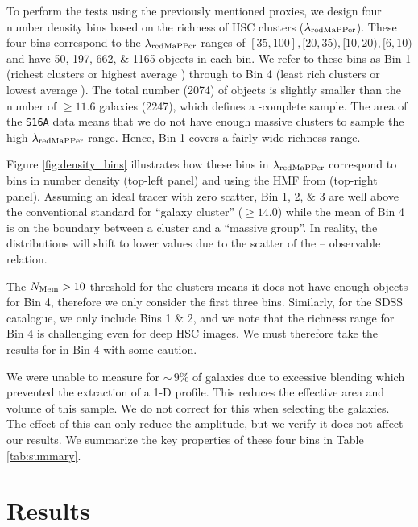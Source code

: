 \documentclass[fleqn,usenatbib,useAMS]{mnras}
\begin{document}
\begin{CJK*}{UTF8}{gbsn}
    To perform the \topn{} tests using the previously mentioned proxies, we design four number
    density bins based on the richness of HSC \redm{} clusters ($\lambda_{\rm redMaPPer}$).
    These four bins correspond to the $\lambda_{\rm redMaPPer}$ ranges of $[35, 100], [20, 35),
    [10, 20), [6, 10)$ and have 50, 197, 662, \& 1165 objects in each bin.
    We refer to these bins as Bin 1 (richest clusters or highest average \mvir{}) through to Bin 4
    (least rich clusters or lowest average \mvir{}).
    The total number (2074) of objects is slightly smaller than the number of $\geq
    11.6$ galaxies (2247), which defines a \mstar{}-complete sample. 
    The area of the \texttt{S16A} data means that we do not have enough massive clusters to sample
    the high $\lambda_{\rm redMaPPer}$ range. 
    Hence, Bin 1 covers a fairly wide richness range.

    Figure \ref{fig:density_bins} illustrates how these bins in $\lambda_{\rm redMaPPer}$ correspond
    to bins in number density (top-left panel) and \mvir{} using the HMF from  (top-right
    panel). 
    Assuming an ideal tracer with zero scatter, Bin 1, 2, \& 3 are well above the conventional
    standard for ``galaxy cluster'' (\logmvir{}$\geq 14.0$) while the mean \mvir{} of Bin 4 is on
    the boundary between a cluster and a ``massive group''. 
    In reality, the \mvir{} distributions will shift to lower values due to the scatter of the 
    \mvir{} -- observable relation.

    The $N_{\rm Mem} > 10$ threshold for the \camira{} clusters means it does not have enough
    objects for Bin 4, therefore we only consider the first three bins.
    Similarly, for the SDSS \redm{} catalogue, we only include Bins 1 \& 2, and we note that the
    richness range for Bin 4 is challenging even for deep HSC images.
    We must therefore take the results for \redm{} in Bin 4 with some caution.

    We were unable to measure \mstar{} for $\sim\,9$\% of galaxies due to excessive blending which
    prevented the extraction of a 1-D profile. 
    This reduces the effective area and volume of this sample.
    We do not correct for this when selecting the \topn{} galaxies. 
    The effect of this can only reduce the \dsigma{} amplitude, but we verify it does not affect our
    results.
    We summarize the key properties of these four bins in Table \ref{tab:summary}.

\section{Results}
    \label{sec:result}


\end{CJK*}
\end{document}
